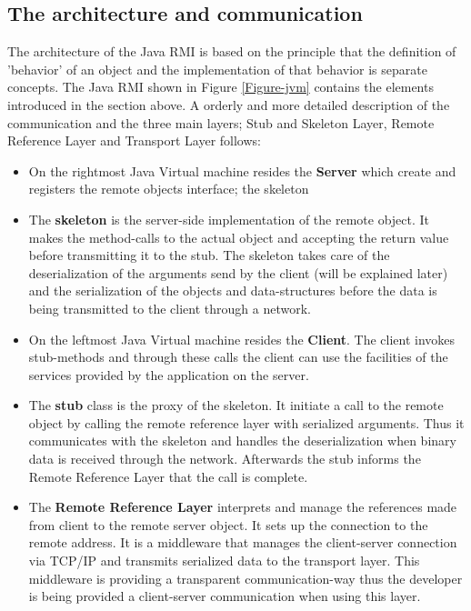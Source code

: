 \documentclass[Main]{subfiles}
\begin{document}
\subsection{The architecture and communication}
The architecture of the Java RMI is based on the principle that the definition of 'behavior' of an object and the implementation of that behavior is separate concepts. The Java RMI shown in Figure \ref{Figure-jvm} contains the elements introduced in the section above. A orderly and more detailed description of the communication and the three main layers; Stub and Skeleton Layer, Remote Reference Layer and Transport Layer follows:
\begin{itemize}

\item On the rightmost Java Virtual machine resides the \textbf{Server} which create and registers the remote objects interface; the skeleton

\item The \textbf{skeleton} is the server-side implementation of the remote object. It makes the method-calls to the actual object and accepting the return value before transmitting it to the stub. The skeleton takes care of the deserialization of the arguments send by the client (will be explained later) and the serialization of the objects and data-structures before the data is being transmitted to the client through a network.

\item On the leftmost Java Virtual machine resides the \textbf{Client}. The client invokes stub-methods and through these calls the client can use the facilities of the services provided by the application on the server.

\item The \textbf{stub} class is the proxy of the skeleton. It initiate a call to the remote object by calling the remote reference layer with serialized arguments. Thus it communicates with the skeleton and handles the deserialization when binary data is received through the network. Afterwards the stub informs the Remote Reference Layer that the call is complete.

\item The \textbf{Remote Reference Layer} interprets and manage the references made from client to the remote server object. It sets up the connection to the remote address. It is a middleware that manages the client-server connection via TCP/IP and transmits serialized data to the transport layer. This middleware is providing a transparent communication-way thus the developer is being provided a client-server communication when using this layer.


\end{itemize}
\end{document}
